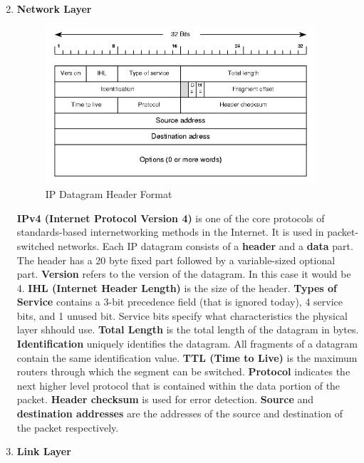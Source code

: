 \documentclass[a4paper,10pt]{article}
\newlength{\strutheight}
\begin{document}
\begin{enumerate}
\begin{adjustbox}{valign=T,raise=\strutheight,minipage={\linewidth}}
	\end{adjustbox} 
	\item \textbf{\color{Magenta} \large Network Layer }\\
	\begin{adjustbox}{valign=T,raise=\strutheight,minipage={\linewidth}}
		\begin{figure}
			\includegraphics[width=10cm]{Images/ip_datagram}
			\caption{IP Datagram Header Format}
		\end{figure}
		\strut{}
		\textbf{IPv4 (Internet Protocol Version 4)} is one of the core protocols of standards-based internetworking methods in the Internet. It is used in packet-switched networks. Each IP datagram consists of a \textbf{header} and a \textbf{data} part. The header has a 20 byte fixed part followed by a variable-sized optional part. \textbf{Version} refers to the version of the datagram. In this case it would be 4. \textbf{IHL (Internet Header Length)} is the size of the header. \textbf{Types of Service} contains a 3-bit precedence field (that is ignored today), 4 service bits, and 1 unused bit. Service bits specify what characteristics the physical layer shhould use. \textbf{Total Length} is the total length of the datagram in bytes. \textbf{Identification} uniquely identifies the datagram. All fragments of a datagram contain the same identification value. \textbf{TTL (Time to Live)} is the maximum routers through which the segment can be switched. \textbf{Protocol} indicates the next higher level protocol that is contained within the data portion of the packet. \textbf{Header checksum} is used for error detection. \textbf{Source} and \textbf{destination addresses} are the addresses of the source and destination of the packet respectively.
	\end{adjustbox} 
	\item \textbf{\color{Magenta} \large Link Layer}\\
	\begin{adjustbox}{valign=T,raise=\strutheight,minipage={\linewidth}}

\end{adjustbox}
\end{enumerate}
\end{document}

